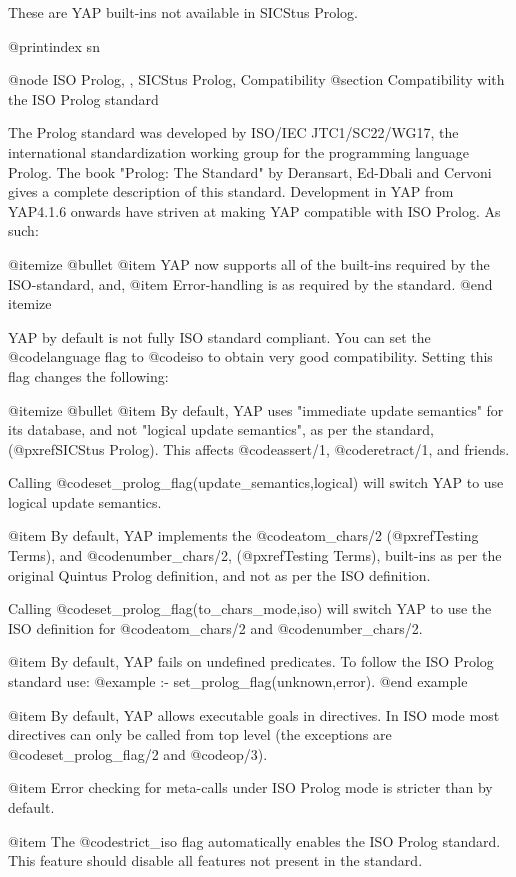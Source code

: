 {{{{{{{{{These are YAP built-ins not available in SICStus Prolog.

@printindex sn


@node ISO Prolog, , SICStus Prolog, Compatibility
@section Compatibility with the ISO Prolog standard

The Prolog standard was developed by ISO/IEC JTC1/SC22/WG17, the
international standardization working group for the programming language
Prolog. The book "Prolog: The Standard" by Deransart, Ed-Dbali and
Cervoni gives a complete description of this standard. Development in
YAP from YAP4.1.6 onwards have striven at making YAP
compatible with ISO Prolog. As such:

@itemize @bullet
@item   YAP now supports all of the built-ins required by the
ISO-standard, and,
@item   Error-handling is as required by the standard.
@end itemize

YAP by default is not fully ISO standard compliant. You can set the 
@code{language} flag to @code{iso} to obtain very good
compatibility. Setting this flag changes the following:

@itemize @bullet
@item By default, YAP uses "immediate update semantics" for its
database, and not "logical update semantics", as per the standard,
(@pxref{SICStus Prolog}). This affects @code{assert/1},
@code{retract/1}, and friends.

Calling @code{set_prolog_flag(update_semantics,logical)} will switch
YAP to use logical update semantics.

@item By default, YAP implements the @code{atom_chars/2}
(@pxref{Testing Terms}), and @code{number_chars/2}, (@pxref{Testing
Terms}), built-ins as per the original Quintus Prolog definition, and
not as per the ISO definition.

Calling @code{set_prolog_flag(to_chars_mode,iso)} will switch
YAP to use the ISO definition for
@code{atom_chars/2} and @code{number_chars/2}.

@item By default, YAP fails on undefined predicates. To follow the ISO
Prolog standard use:
@example
:- set_prolog_flag(unknown,error).
@end example

@item By default, YAP allows executable goals in directives. In ISO mode
most directives can only be called from top level (the exceptions are
@code{set_prolog_flag/2} and @code{op/3}).

@item Error checking for meta-calls under ISO Prolog mode is stricter
than by default.

@item The @code{strict_iso} flag automatically enables the ISO Prolog
standard. This feature should disable all features not present in the
standard.

}}}}}}}}}
